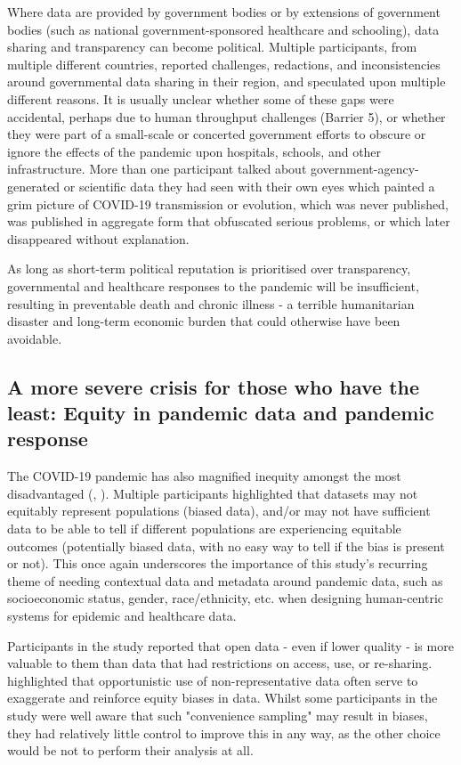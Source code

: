 \documentclass{CUP-JNL-DAP}%
\begin{document}
Where data are provided by government bodies or by extensions of government bodies (such as national government-sponsored healthcare and schooling), data sharing and transparency can become political. Multiple participants, from multiple different countries, reported challenges, redactions, and inconsistencies around governmental data sharing in their region, and speculated upon multiple different reasons. It is usually unclear whether some of these gaps were accidental, perhaps due to human throughput challenges (Barrier 5), or whether they were part of a small-scale or concerted government efforts to obscure or ignore the effects of the pandemic upon hospitals, schools, and other infrastructure. More than one participant talked about government-agency-generated or scientific data they had seen with their own eyes which painted a grim picture of COVID-19 transmission or evolution, which was never published, was published in aggregate form that obfuscated serious problems, or which later disappeared without explanation. 

As long as short-term political reputation is prioritised over transparency, governmental and healthcare responses to the pandemic will be insufficient, resulting in preventable death and chronic illness - a terrible humanitarian disaster and long-term economic burden that could otherwise have been avoidable.

\subsection{A more severe crisis for those who have the least: Equity in pandemic data and pandemic response}

The COVID-19 pandemic has also magnified inequity amongst the most disadvantaged (\cite{alon_gender_inequality_2020}, \cite{pilecco_racial_inequality_2020}).  Multiple participants highlighted that datasets may not equitably represent populations (biased data), and/or may not have sufficient data to be able to tell if different populations are experiencing equitable outcomes (potentially biased data, with no easy way to tell if the bias is present or not). This once again underscores the importance of this study's recurring theme of needing contextual data and metadata around pandemic data, such as socioeconomic status, gender, race/ethnicity, etc. when designing human-centric systems for epidemic and healthcare data. 

Participants in the study reported that open data - even if lower quality - is more valuable to them than data that had restrictions on access, use, or re-sharing. \cite{chen_ethical_ml_2021} highlighted that opportunistic use of non-representative data often serve to exaggerate and reinforce equity biases in data. Whilst some participants in the study were well aware that such "convenience sampling" may result in biases, they had relatively little control to improve this in any way, as the other choice would be not to perform their analysis at all. 
\end{document}
